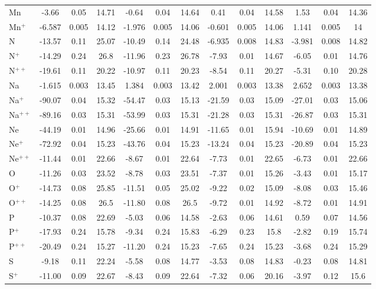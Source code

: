 \begin{longtable}{l!{\vrule width 0.25pt}ccc!{\vrule width 0.25pt}ccc!{\vrule width 0.25pt}ccc!{\vrule width 0.25pt}ccc}
Mn & -3.66 & 0.05 & 14.71 & -0.64 & 0.04 & 14.64 & 0.41 & 0.04 & 14.58 & 1.53 & 0.04 & 14.36 \\
Mn$^+$ & -6.587 & 0.005 & 14.12 & -1.976 & 0.005 & 14.06 & -0.601 & 0.005 & 14.06 & 1.141 & 0.005 & 14 \\
N & -13.57 & 0.11 & 25.07 & -10.49 & 0.14 & 24.48 & -6.935 & 0.008 & 14.83 & -3.981 & 0.008 & 14.82 \\
N$^+$ & -14.29 & 0.24 & 26.8 & -11.96 & 0.23 & 26.78 & -7.93 & 0.01 & 14.67 & -6.05 & 0.01 & 14.76 \\
N$^{++}$ & -19.61 & 0.11 & 20.22 & -10.97 & 0.11 & 20.23 & -8.54 & 0.11 & 20.27 & -5.31 & 0.10 & 20.28 \\
Na & -1.615 & 0.003 & 13.45 & 1.384 & 0.003 & 13.42 & 2.001 & 0.003 & 13.38 & 2.652 & 0.003 & 13.38 \\
Na$^+$ & -90.07 & 0.04 & 15.32 & -54.47 & 0.03 & 15.13 & -21.59 & 0.03 & 15.09 & -27.01 & 0.03 & 15.06 \\
Na$^{++}$ & -89.16 & 0.03 & 15.31 & -53.99 & 0.03 & 15.31 & -21.28 & 0.03 & 15.31 & -26.87 & 0.03 & 15.31 \\
Ne & -44.19 & 0.01 & 14.96 & -25.66 & 0.01 & 14.91 & -11.65 & 0.01 & 15.94 & -10.69 & 0.01 & 14.89 \\
Ne$^+$ & -72.92 & 0.04 & 15.23 & -43.76 & 0.04 & 15.23 & -13.24 & 0.04 & 15.23 & -20.89 & 0.04 & 15.23 \\
Ne$^{++}$ & -11.44 & 0.01 & 22.66 & -8.67 & 0.01 & 22.64 & -7.73 & 0.01 & 22.65 & -6.73 & 0.01 & 22.66 \\
O & -11.26 & 0.03 & 23.52 & -8.78 & 0.03 & 23.51 & -7.37 & 0.01 & 15.26 & -3.43 & 0.01 & 15.17 \\
O$^+$ & -14.73 & 0.08 & 25.85 & -11.51 & 0.05 & 25.02 & -9.22 & 0.02 & 15.09 & -8.08 & 0.03 & 15.46 \\
O$^{++}$ & -14.25 & 0.08 & 26.5 & -11.80 & 0.08 & 26.5 & -9.72 & 0.01 & 14.92 & -8.72 & 0.01 & 14.91 \\
P & -10.37 & 0.08 & 22.69 & -5.03 & 0.06 & 14.58 & -2.63 & 0.06 & 14.61 & 0.59 & 0.07 & 14.56 \\
P$^+$ & -17.93 & 0.24 & 15.78 & -9.34 & 0.24 & 15.83 & -6.29 & 0.23 & 15.8 & -2.82 & 0.19 & 15.74 \\
P$^{++}$ & -20.49 & 0.24 & 15.27 & -11.20 & 0.24 & 15.23 & -7.65 & 0.24 & 15.23 & -3.68 & 0.24 & 15.29 \\
S & -9.18 & 0.11 & 22.24 & -5.58 & 0.08 & 14.77 & -3.53 & 0.08 & 14.83 & -0.23 & 0.08 & 14.81 \\
S$^+$ & -11.00 & 0.09 & 22.67 & -8.43 & 0.09 & 22.64 & -7.32 & 0.06 & 20.16 & -3.97 & 0.12 & 15.6 \\

\end{longtable}
